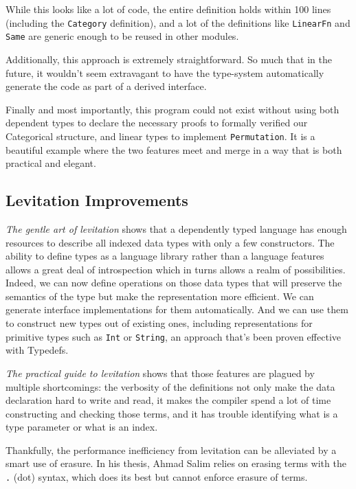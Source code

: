 \documentclass[
]{article}
\begin{document}
While this looks like a lot of code, the entire definition holds within
100 lines (including the \texttt{Category} definition), and a lot of the
definitions like \texttt{LinearFn} and \texttt{Same} are generic enough
to be reused in other modules.

Additionally, this approach is extremely straightforward. So much that
in the future, it wouldn't seem extravagant to have the type-system
automatically generate the code as part of a derived interface.

Finally and most importantly, this program could not exist without using
both dependent types to declare the necessary proofs to formally
verified our Categorical structure, and linear types to implement
\texttt{Permutation}. It is a beautiful example where the two features
meet and merge in a way that is both practical and elegant.

\hypertarget{levitation-improvements}{%
\subsection{Levitation Improvements}\label{levitation-improvements}}

\emph{The gentle art of levitation}\cite{levitation} shows that a
dependently typed language has enough resources to describe all indexed
data types with only a few constructors. The ability to define types as
a language library rather than a language features allows a great deal
of introspection which in turns allows a realm of possibilities. Indeed,
we can now define operations on those data types that will preserve the
semantics of the type but make the representation more efficient. We can
generate interface implementations for them automatically. And we can
use them to construct new types out of existing
ones\cite{category_of_containers}\cite{delta_for_data}\cite{indexed_containers},
including representations for primitive types such as \texttt{Int} or
\texttt{String}, an approach that's been proven effective with
Typedefs\cite{typedefs}.

\emph{The practical guide to levitation}\cite{levitation} shows that
those features are plagued by multiple shortcomings: the verbosity of
the definitions not only make the data declaration hard to write and
read, it makes the compiler spend a lot of time constructing and
checking those terms, and it has trouble identifying what is a type
parameter or what is an index.

Thankfully, the performance inefficiency from levitation can be
alleviated by a smart use of erasure. In his thesis, Ahmad Salim relies
on erasing terms with the \texttt{.} (dot) syntax, which does its best
but cannot enforce erasure of terms.
\end{document}

